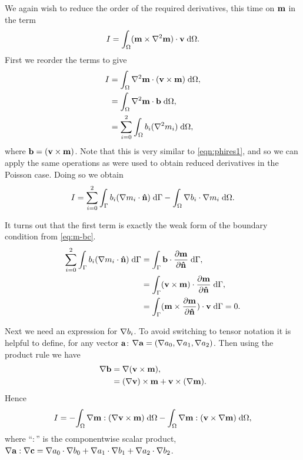 We again wish to reduce the order of the required derivatives, this time on $\mathbf{m}$ in the term
\begin{equation}
  I = {\int_{\Omega}  (\mathbf{m} \times \nabla^2 \mathbf{m}) \cdot \mathbf{v}  {\; \text{d}} {\Omega}}.
  \label{eq:46}
\end{equation}
First we reorder the terms to give
\begin{equation}
  \begin{aligned}
    I &= {\int_{\Omega} \nabla^2 \mathbf{m} \cdot (\mathbf{v} \times \mathbf{m}) {\; \text{d}} {\Omega}}, \\
      &= {\int_{\Omega} \nabla^2 \mathbf{m} \cdot {\mathbf{b}} {\; \text{d}} {\Omega}}, \\
      &= \sum_{i=0}^2 {\int_{\Omega}  b_i (\nabla^2 m_i) {\; \text{d}} {\Omega}},
  \end{aligned}
\end{equation}
where ${\mathbf{b}} = (\mathbf{v} \times \mathbf{m})$.
Note that this is very similar to \cref{eqn:phires1}, and so we can apply the same operations as were used to obtain reduced derivatives in the Poisson case. 
Doing so we obtain
\begin{equation}
  I = \sum_{i=0}^2 {\int_{{\Gamma}} b_i (\nabla m_i \cdot \mathbf{\hat{n}}) {\; \text{d}} {{\Gamma}}} - {\int_{\Omega} \nabla b_i \cdot \nabla m_i {\; \text{d}} {\Omega}}.
\end{equation}

It turns out that the first term is exactly the weak form of the boundary condition from \cref{eq:m-bc}.
\begin{equation}
  \begin{aligned}
    \sum_{i=0}^2 {\int_{{\Gamma}} b_i (\nabla m_i \cdot \mathbf{\hat{n}}) {\; \text{d}} {{\Gamma}}} 
    &= {\int_{{\Gamma}} {\mathbf{b}} \cdot \frac{\partial \mathbf{m}}{\partial \mathbf{\hat{n}}} {\; \text{d}} {{\Gamma}}}, \\
    &=  {\int_{{\Gamma}} (\mathbf{v} \times \mathbf{m}) \cdot \frac{\partial \mathbf{m}}{\partial \mathbf{\hat{n}}} {\; \text{d}} {{\Gamma}}}, \\
    &=  {\int_{{\Gamma}} (\mathbf{m} \times \frac{\partial \mathbf{m}}{\partial \mathbf{\hat{n}}}) \cdot \mathbf{v} {\; \text{d}} {{\Gamma}}} = 0 .
  \end{aligned}
\end{equation}

Next we need an expression for $\nabla b_i$.
To avoid switching to tensor notation it is helpful to define, for any vector ${\mathbf{a}}$: $\nabla {\mathbf{a}} = (\nabla a_0, \nabla a_1, \nabla a_2)$.
Then using the product rule we have
\begin{equation}
  \begin{aligned}
    \nabla {\mathbf{b}} &= \nabla {\left( \mathbf{v}\times \mathbf{m}\right)}, \\
    & = (\nabla \mathbf{v}) \times \mathbf{m} + \mathbf{v} \times (\nabla \mathbf{m}).
  \end{aligned}
\end{equation}
Hence
\begin{equation}
  I = - {\int_{\Omega} \nabla \mathbf{m} : {\left( \nabla \mathbf{v} \times \mathbf{m} \right)} {\; \text{d}} {\Omega}} 
      - {\int_{\Omega} \nabla \mathbf{m} : {\left( \mathbf{v} \times \nabla \mathbf{m} \right)} {\; \text{d}} {\Omega}},
      \label{eq:72}
\end{equation}
where ``$:$'' is the componentwise scalar product, \eg $\nabla {\mathbf{a}} : \nabla {\mathbf{c}} = \nabla a_0 \cdot \nabla b_0 + \nabla a_1 \cdot \nabla b_1 + \nabla a_2 \cdot \nabla b_2$.

